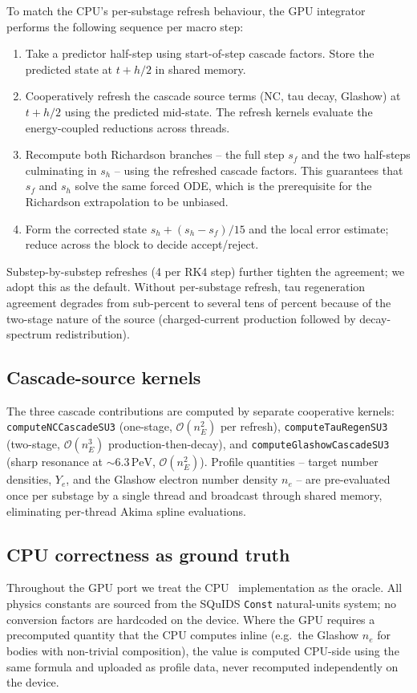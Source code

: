 To match the CPU's per-substage refresh behaviour, the GPU integrator
performs the following sequence per macro step:
\begin{enumerate}
  \item Take a predictor half-step using start-of-step cascade
    factors. Store the predicted state at $t+h/2$ in shared memory.
  \item Cooperatively refresh the cascade source terms (NC, tau
    decay, Glashow) at $t+h/2$ using the predicted mid-state. The
    refresh kernels evaluate the energy-coupled reductions across
    threads.
  \item Recompute both Richardson branches -- the full step $s_f$ and
    the two half-steps culminating in $s_h$ -- using the refreshed
    cascade factors. This guarantees that $s_f$ and $s_h$ solve the
    same forced ODE, which is the prerequisite for the Richardson
    extrapolation to be unbiased.
  \item Form the corrected state $s_h + (s_h - s_f)/15$ and the local
    error estimate; reduce across the block to decide accept/reject.
\end{enumerate}
Substep-by-substep refreshes (4 per RK4 step) further tighten the
agreement; we adopt this as the default. Without per-substage
refresh, tau regeneration agreement degrades from sub-percent to
several tens of percent because of the two-stage nature of the source
(charged-current production followed by decay-spectrum redistribution).

\subsection{Cascade-source kernels}

The three cascade contributions are computed by separate cooperative
kernels: \texttt{computeNCCascadeSU3} (one-stage, $\mathcal{O}(n_E^2)$
per refresh), \texttt{computeTauRegenSU3} (two-stage, $\mathcal{O}(n_E^3)$
production-then-decay), and \texttt{computeGlashowCascadeSU3} (sharp
resonance at $\sim 6.3\,\mathrm{PeV}$, $\mathcal{O}(n_E^2)$). Profile
quantities -- target number densities, $Y_e$, and the Glashow electron
number density $n_e$ -- are pre-evaluated once per substage by a
single thread and broadcast through shared memory, eliminating per-thread
Akima spline evaluations.


\subsection{CPU correctness as ground truth}

Throughout the GPU port we treat the CPU \nusquids\ implementation as
the oracle. All physics constants are sourced from the SQuIDS
\texttt{Const} natural-units system; no conversion factors are
hardcoded on the device. Where the GPU requires a precomputed quantity
that the CPU computes inline (e.g.\ the Glashow $n_e$ for bodies with
non-trivial composition), the value is computed CPU-side using the
same formula and uploaded as profile data, never recomputed
independently on the device.
